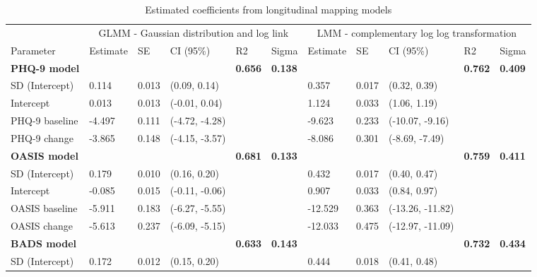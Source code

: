 \documentclass[
  journal=largetwo,
  manuscript=original-article,
  year=2023-Submission,
]{cup-journal}
\begin{document}
\begin{table}

\caption{\label{tab:cfscl}Estimated coefficients from longitudinal mapping models}
\centering
\begin{tabular}[t]{lll>{\raggedright\arraybackslash}p{6em}llll>{\raggedright\arraybackslash}p{6em}ll}
\toprule
\multicolumn{1}{c}{ } & \multicolumn{5}{c}{GLMM - Gaussian distribution and log link} & \multicolumn{5}{c}{LMM - complementary log log transformation} \\
\cmidrule(l{3pt}r{3pt}){2-6} \cmidrule(l{3pt}r{3pt}){7-11}
Parameter & Estimate & SE & CI (95\%) & R2 & Sigma & Estimate & SE & CI (95\%) & R2 & Sigma\\
\midrule
\textbf{PHQ-9 model} & \textbf{} & \textbf{} & \textbf{} & \textbf{0.656} & \textbf{0.138} & \textbf{} & \textbf{} & \textbf{} & \textbf{0.762} & \textbf{0.409}\\
\cmidrule{1-11}
SD (Intercept) & 0.114 & 0.013 & (0.09, 0.14) &  &  & 0.357 & 0.017 & (0.32, 0.39) &  & \\
\cmidrule{1-11}
Intercept & 0.013 & 0.013 & (-0.01,  0.04) &  &  & 1.124 & 0.033 & (1.06, 1.19) &  & \\
\cmidrule{1-11}
PHQ-9 baseline & -4.497 & 0.111 & (-4.72, -4.28) &  &  & -9.623 & 0.233 & (-10.07,  -9.16) &  & \\
\cmidrule{1-11}
PHQ-9 change & -3.865 & 0.148 & (-4.15, -3.57) &  &  & -8.086 & 0.301 & (-8.69, -7.49) &  & \\
\cmidrule{1-11}
\textbf{OASIS model} & \textbf{} & \textbf{} & \textbf{} & \textbf{0.681} & \textbf{0.133} & \textbf{} & \textbf{} & \textbf{} & \textbf{0.759} & \textbf{0.411}\\
\cmidrule{1-11}
SD (Intercept) & 0.179 & 0.010 & (0.16, 0.20) &  &  & 0.432 & 0.017 & (0.40, 0.47) &  & \\
\cmidrule{1-11}
Intercept & -0.085 & 0.015 & (-0.11, -0.06) &  &  & 0.907 & 0.033 & (0.84, 0.97) &  & \\
\cmidrule{1-11}
OASIS baseline & -5.911 & 0.183 & (-6.27, -5.55) &  &  & -12.529 & 0.363 & (-13.26, -11.82) &  & \\
\cmidrule{1-11}
OASIS change & -5.613 & 0.237 & (-6.09, -5.15) &  &  & -12.033 & 0.475 & (-12.97, -11.09) &  & \\
\cmidrule{1-11}
\textbf{BADS model} & \textbf{} & \textbf{} & \textbf{} & \textbf{0.633} & \textbf{0.143} & \textbf{} & \textbf{} & \textbf{} & \textbf{0.732} & \textbf{0.434}\\
\cmidrule{1-11}
SD (Intercept) & 0.172 & 0.012 & (0.15, 0.20) &  &  & 0.444 & 0.018 & (0.41, 0.48) &  & \\

\end{tabular}
\end{table}
\end{document}
